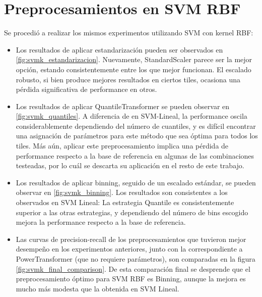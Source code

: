 


\section{Preprocesamientos en SVM RBF}

Se procedió a realizar los mismos experimentos utilizando SVM con kernel RBF:

\begin{itemize}
\item Los resultados de aplicar estandarización pueden ser observados en \ref{fig:svmk_estandarizacion}. Nuevamente, StandardScaler parece ser la mejor opción, estando consistentemente entre los que mejor funcionan. El escalado robusto, si bien produce mejores resultados en ciertos tiles, ocasiona una pérdida significativa de performance en otros.

\item Los resultados de aplicar QuantileTransformer se pueden observar en \ref{fig:svmk_quantiles}. A diferencia de en SVM-Lineal, la performance oscila considerablemente dependiendo del número de cuantiles, y es difícil encontrar una asignación de parámetros para este método que sea óptima para todos los tiles. Más aún, aplicar este preprocesamiento implica una pérdida de performance respecto a la base de referencia en algunas de las combinaciones testeadas, por lo cuál se descarta su aplicación en el resto de este trabajo.

\item Los resultados de aplicar binning, seguido de un escalado estándar, se pueden observar en \ref{fig:svmk_binning}. Los resultados son consistentes a los observados en SVM Lineal: La estrategia Quantile es consistentemente superior a las otras estrategias, y dependiendo del número de bins escogido mejora la performance respecto a la base de referencia. 

\item Las curvas de precision-recall de los preprocesamientos que tuvieron mejor desempeño en los experimentos anteriores, junto con la correspondiente a PowerTransformer (que no requiere parámetros), son comparadas en la figura \ref{fig:svmk_final_comparison}. De esta comparación final se desprende que el preprocesamiento óptimo para SVM RBF es Binning, aunque la mejora es mucho más modesta que la obtenida en SVM Lineal.
\end{itemize}


